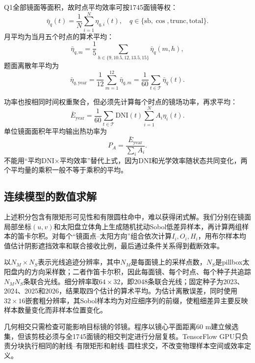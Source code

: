 Q1全部镜面等面积，故时点平均效率可按1745面镜等权：
\begin{equation}
\bar\eta_q(t)=\frac{1}{N}\sum_{i=1}^{N}\eta_{q,i}(t),
\quad q\in\{\mathrm{sb},\cos,\mathrm{trunc},\mathrm{total}\}.
\end{equation}
月平均为当月五个时点的算术平均：
\begin{equation}
\bar\eta_{q,m}=\frac{1}{5}\sum_{h\in\{9,10.5,12,13.5,15\}}\bar\eta_q(m,h),
\end{equation}
题面离散年平均为
\begin{equation}
\bar\eta_{q,\mathrm{year}}=\frac{1}{12}\sum_{m=1}^{12}\bar\eta_{q,m}
=\frac{1}{60}\sum_{t\in\mathcal{T}}\bar\eta_q(t).
\end{equation}

功率也按相同时间权重聚合，但必须先计算每个时点的镜场功率，再求平均：
\begin{equation}
\bar E_{\mathrm{year}}=\frac{1}{60}\sum_{t\in\mathcal{T}}
\mathrm{DNI}(t)\sum_{i=1}^{N}A_i\eta_i(t).
\end{equation}
单位镜面面积年平均输出热功率为
\begin{equation}
P_A=\frac{\bar E_{\mathrm{year}}}{\sum_iA_i}.
\end{equation}
不能用“平均DNI$\times$平均效率”替代上式，因为DNI和光学效率随状态共同变化，两个平均量的乘积一般不等于乘积的平均。

\subsection{连续模型的数值求解}

上述积分包含有限矩形可见性和有限圆柱命中，难以获得闭式解。我们分别在镜面局部坐标$(u,v)$和太阳盘立体角上生成随机扰动Sobol低差异样本，再计算两组样本的笛卡尔积。对每个“镜面点--太阳方向”组合依次计算$I_i,O_i,H_i$，用布尔样本均值估计阴影遮挡效率和联合接收比例，最后通过条件关系得到截断效率。

以$N_M\times N_S$表示光线追迹分辨率，其中$N_M$是每面镜上的采样点数，$N_S$是pillbox太阳盘内的方向采样数；二者作笛卡尔积，因此每面镜、每个时点、每个种子共追踪$N_MN_S$条联合光线。细分辨率取$64\times32$，即2048条联合光线；固定种子为2023、2024、2025和2026，结果取四个估计的算术平均。为估计离散误差，同时使用$32\times16$嵌套粗分辨率，其Sobol样本均为对应细序列的前缀，使粗细差异主要反映样本数量变化而非样本位置变化。

几何相交只需检查可能影响目标镜的邻镜。程序以镜心平面距离60 m建立候选集，但该剪枝必须与全1745面镜的相交判定进行分层复核。TensorFlow GPU只负责分块执行相同的射线--有限矩形和射线--圆柱求交，不改变物理样本空间或效率定义。

